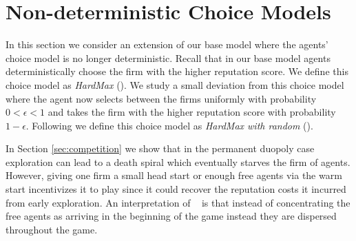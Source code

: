 \documentclass[../competing_bandits.tex]{subfiles}
\begin{document}
\section{Non-deterministic Choice Models}\label{sec:non_greedy}


In this section we consider an extension of our base model where the agents' choice model is no longer deterministic. Recall that in our base model agents deterministically choose the firm with the higher reputation score. We define this choice model as \textit{HardMax} (\HM). We study a small deviation from this choice model where the agent now selects between the firms uniformly with probability $0 < \epsilon < 1$ and takes the firm with the higher reputation score with probability $1 - \epsilon$. Following \cite{mansour2018competing} we define this choice model as \textit{HardMax with random} (\HMR).

In Section \ref{sec:competition} we show that in the permanent duopoly
case exploration can lead to a death spiral which eventually starves
the firm of agents. However, giving one firm a small head start or
enough free agents via the warm start incentivizes it to play \TS
since it could recover the reputation costs it incurred from early
exploration. An interpretation of \HMR~ is that instead of
concentrating the free agents as arriving in the beginning of the game
instead they are dispersed throughout the game.
\end{document}
